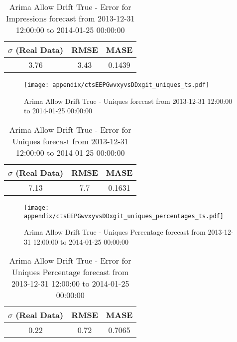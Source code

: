 \begin{table}[H]
\centering
\footnotesize
\begin{tabular}{ccc}
$\sigma$ (Real Data) & RMSE & MASE   \\ \hline
3.76 & 3.43 & 0.1439 \\
\end{tabular}

\vspace{0.5cm}

\caption{
Arima Allow Drift True - Error for Impressions forecast from 2013-12-31 12:00:00 to 2014-01-25 00:00:00}
\end{table}

\begin{figure}[H] \begin{center} \leavevmode
\texttt{[image: appendix/ctsEEPGwvxyvsDDxgit\_uniques\_ts.pdf]} \caption{
Arima Allow Drift True - Uniques forecast from 2013-12-31 12:00:00 to 2014-01-25 00:00:00} \label{fig:appendix/ctsEEPGwvxyvsDDxgit_uniques_ts.pdf} \end{center}
\end{figure}

\begin{table}[H]
\centering
\footnotesize
\begin{tabular}{ccc}
$\sigma$ (Real Data) & RMSE & MASE   \\ \hline
7.13 & 7.7 & 0.1631 \\
\end{tabular}

\vspace{0.5cm}

\caption{
Arima Allow Drift True - Error for Uniques forecast from 2013-12-31 12:00:00 to 2014-01-25 00:00:00}
\end{table}

\begin{figure}[H] \begin{center} \leavevmode
\texttt{[image: appendix/ctsEEPGwvxyvsDDxgit\_uniques\_percentages\_ts.pdf]} \caption{
Arima Allow Drift True - Uniques Percentage forecast from 2013-12-31 12:00:00 to 2014-01-25 00:00:00} \label{fig:appendix/ctsEEPGwvxyvsDDxgit_uniques_percentages_ts.pdf} \end{center}
\end{figure}

\begin{table}[H]
\centering
\footnotesize
\begin{tabular}{ccc}
$\sigma$ (Real Data) & RMSE & MASE   \\ \hline
0.22 & 0.72 & 0.7065 \\
\end{tabular}

\vspace{0.5cm}

\caption{
Arima Allow Drift True - Error for Uniques Percentage forecast from 2013-12-31 12:00:00 to 2014-01-25 00:00:00}
\end{table}

